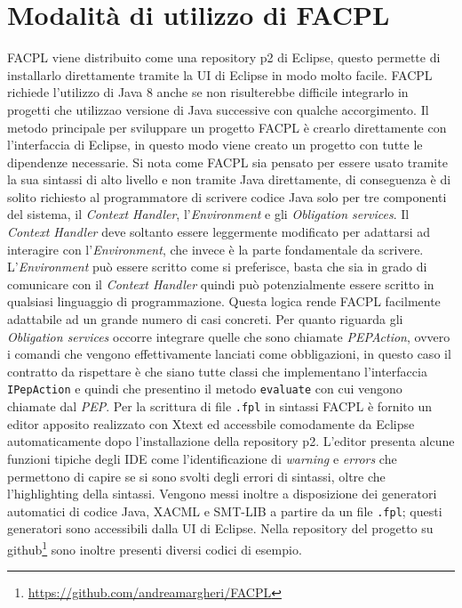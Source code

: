 \section{Modalità di utilizzo di FACPL}
FACPL viene distribuito come una repository p2 di Eclipse, questo permette di installarlo direttamente tramite la UI di Eclipse in modo molto facile. FACPL richiede l'utilizzo di Java 8 anche se non risulterebbe difficile integrarlo in progetti che utilizzao versione di Java successive con qualche accorgimento.\medbreak
Il metodo principale per sviluppare un progetto FACPL è crearlo direttamente con l'interfaccia di Eclipse, in questo modo viene creato un progetto con tutte le dipendenze necessarie. Si nota come FACPL sia pensato per essere usato tramite la sua sintassi di alto livello e non tramite Java direttamente, di conseguenza è di solito richiesto al programmatore di scrivere codice Java solo per tre componenti del sistema, il \emph{Context Handler}, l'\emph{Environment} e gli \emph{Obligation services}.\medbreak
Il \emph{Context Handler} deve soltanto essere leggermente modificato per adattarsi ad interagire con l'\emph{Environment}, che invece è la parte fondamentale da scrivere. L'\emph{Environment} può essere scritto come si preferisce, basta che sia in grado di comunicare con il \emph{Context Handler} quindi può potenzialmente essere scritto in qualsiasi linguaggio di programmazione. Questa logica rende FACPL facilmente adattabile ad un grande numero di casi concreti. Per quanto riguarda gli \emph{Obligation services} occorre integrare quelle che sono chiamate \emph{PEPAction}, ovvero i comandi che vengono effettivamente lanciati come obbligazioni, in questo caso il contratto da rispettare è che siano tutte classi che implementano l'interfaccia \texttt{IPepAction} e quindi che presentino il metodo \texttt{evaluate} con cui vengono chiamate dal \emph{PEP}.\medbreak
Per la scrittura di file \texttt{.fpl} in sintassi FACPL è fornito un editor apposito realizzato con Xtext\cite{eclipseXtext} ed accessbile comodamente da Eclipse automaticamente dopo l'installazione della repository p2. L'editor presenta alcune funzioni tipiche degli IDE come l'identificazione di \emph{warning} e \emph{errors} che permettono di capire se si sono svolti degli errori di sintassi, oltre che l'highlighting della sintassi. Vengono messi inoltre a disposizione dei generatori automatici di codice Java, XACML e SMT-LIB a partire da un file \texttt{.fpl}; questi generatori sono accessibili dalla UI di Eclipse. Nella repository del progetto su github\footnote{\url{https://github.com/andreamargheri/FACPL}} sono inoltre presenti diversi codici di esempio.\medbreak

